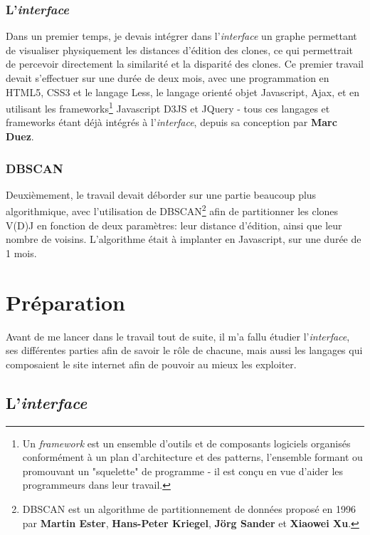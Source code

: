\documentclass[pdftex,12pt,a4paper]{report}
\begin{document}
\begin{spacing}{1.2}
\subsection*{L'\textit{interface}}
Dans un premier temps, je devais intégrer dans l'\textit{interface} un graphe permettant de visualiser physiquement les distances d'édition des clones, ce qui permettrait de percevoir directement la similarité et la disparité des clones.
\newline
Ce premier travail devait s'effectuer sur une durée de deux mois, avec une programmation en HTML5, CSS3 et le langage Less, le langage orienté objet Javascript, Ajax, et en utilisant les frameworks\footnote{Un \textit{framework} est un ensemble d'outils et de composants logiciels organisés conformément à un plan d'architecture et des patterns, l'ensemble formant ou promouvant un "squelette" de programme - il est conçu en vue d'aider les programmeurs dans leur travail.} Javascript D3JS et JQuery - tous ces langages et frameworks étant déjà intégrés à l'\textit{interface}, depuis sa conception par \textbf{Marc Duez}.

\subsection*{DBSCAN}
Deuxièmement, le travail devait déborder sur une partie beaucoup plus algorithmique, avec l'utilisation de DBSCAN\footnote{DBSCAN est un algorithme de partitionnement de données proposé en 1996 par \textbf{Martin Ester}, \textbf{Hans-Peter Kriegel}, \textbf{Jörg Sander} et \textbf{Xiaowei Xu}.} afin de partitionner les clones V(D)J en fonction de deux paramètres: leur distance d'édition, ainsi que leur nombre de voisins.
\newline
L'algorithme était à implanter en Javascript, sur une durée de 1 mois.

\chapter{Préparation}

Avant de me lancer dans le travail tout de suite, il m'a fallu étudier l'\textit{interface}, ses différentes parties afin de savoir le rôle de chacune, mais aussi les langages qui composaient le site internet afin de pouvoir au mieux les exploiter.

\section{L'\textit{interface}}


\end{spacing}
\end{document}
